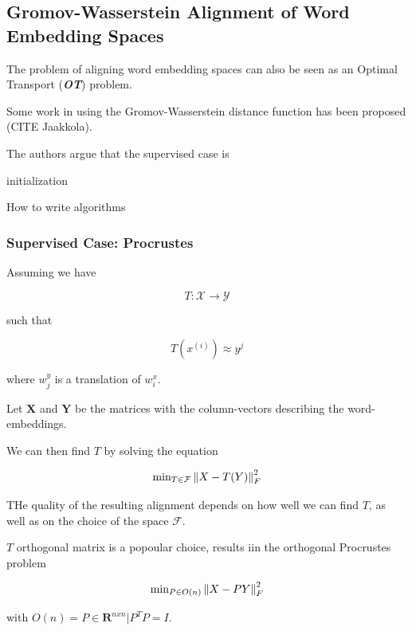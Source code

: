 \documentclass[a4paper,12pt,twoside,openright]{report}
\begin{document}
\subsection{Gromov-Wasserstein Alignment of Word Embedding Spaces}

The problem of aligning word embedding spaces can also be seen as an Optimal Transport (\textit{\textbf{OT}}) problem.

Some work in using the Gromov-Wasserstein distance function has been proposed (CITE Jaakkola). 

The authors argue that the supervised case is 

\begin{algorithm}[H]
\SetAlgoLined
{}
 initialization\;
 \caption{How to write algorithms}
\end{algorithm}


\subsubsection{Supervised Case: Procrustes}

Assuming we have

$$
T : \mathcal{X} \rightarrow \mathcal{Y}
$$

such that 

$$
T(x^(i)) \approx y^{j}
$$

where $w_j^y$ is a translation of $w_i^x$.

Let $\mathbf{X}$ and $\mathbf{Y}$ be the matrices with the column-vectors describing the word-embeddings.

We can then find $T$ by solving the equation

\begin{equation}
\text{min}_{T \in \mathcal{F}} \left\lVert X - T(Y)\right\rVert_F^2
\end{equation}

THe quality of the resulting alignment depends on how well we can find $T$, as well as on the choice of the space $\mathcal{F}$.

$T$ orthogonal matrix is a popoular choice, results iin the orthogonal Procrustes problem

\begin{equation}
\text{min}_{P \in O(n)} \left\lVert X - PY\right\rVert_F^2
\end{equation}

with $O(n) = {P \in \mathbf{R}^{n x n} | P^T P = I}$.
\end{document}
